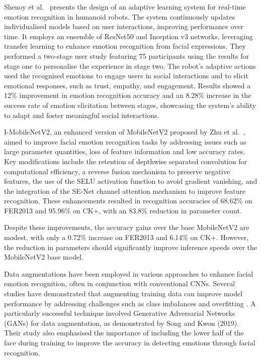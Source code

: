 Shenoy et al.\ \cite{9900581} presents the design of an adaptive learning system for real-time emotion recognition in humanoid robots. The system continuously updates individualised models based on user interactions, improving performance over time. It employs an ensemble of ResNet50 and Inception v3 networks, leveraging transfer learning to enhance emotion recognition from facial expressions. They performed a two-stage user study featuring 75 participants using the results for stage one to personalise the experience in stage two. The robot's adaptive actions used the recognised emotions to engage users in social interactions and to elicit emotional responses, such as trust, empathy, and engagement. Results showed a 12\% improvement in emotion recognition accuracy and an 8.28\% increase in the success rate of emotion elicitation between stages, showcasing the system's ability to adapt and foster meaningful social interactions.

I-MobileNetV2, an enhanced version of MobileNetV2 proposed by Zhu et al.\ \cite{Zhu2024-gy}, aimed to improve facial emotion recognition tasks by addressing issues such as large parameter quantities, loss of feature information and low accuracy rates. Key modifications include the retention of depthwise separated convolution for computational efficiency, a reverse fusion mechanism to preserve negative features, the use of the SELU activation function to avoid gradient vanishing, and the integration of the SE-Net channel attention mechanism to improve feature recognition. These enhancements resulted in recognition accuracies of 68.62\% on FER2013 and 95.96\% on CK+, with an 83.8\% reduction in parameter count.

Despite these improvements, the accuracy gains over the base MobileNetV2 are modest, with only a 0.72\% increase on FER2013 and 6.14\% on CK+. However, the reduction in parameters should significantly improve inference speeds over the MobileNetV2 base model.

Data augmentations have been employed in various approaches to enhance facial emotion recognition, often in conjunction with conventional CNNs. Several studies have demonstrated that augmenting training data can improve model performance by addressing challenges such as class imbalances and overfitting \cite{Saxena2022-sr} \cite{Ruiz-Garcia2018-uy}. A particularly successful technique involved Generative Adversarial Networks (GANs) for data augmentation, as demonstrated by Song and Kwon (2019). Their study also emphasised the importance of including the lower half of the face during training to improve the accuracy in detecting emotions through facial recognition.

